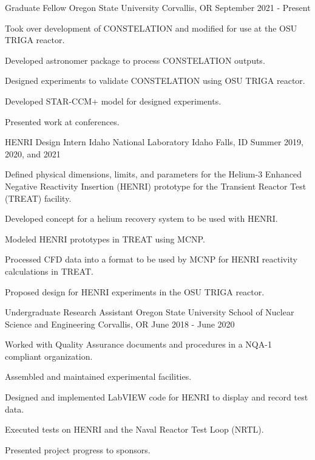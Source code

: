 
\begin{cventries}
  \cventry
    {Graduate Fellow} %
    {Oregon State University} %
    {Corvallis, OR} %
    {September 2021 - Present} %
    {
      \begin{cvitems} %
        \item {Took over development of CONSTELATION and modified for use at the OSU TRIGA reactor.}
        \item{Developed astronomer package to process CONSTELATION outputs.}
        \item{Designed experiments to validate CONSTELATION using OSU TRIGA reactor.}
        \item{Developed STAR-CCM+ model for designed experiments.}
        \item{Presented work at conferences.}
      \end{cvitems}
    }


  \cventry
    {HENRI Design Intern} %
    {Idaho National Laboratory} %
    {Idaho Falls, ID} %
    {Summer 2019, 2020, and 2021} %
    {
      \begin{cvitems} %
        \item {Defined physical dimensions, limits, and parameters for the Helium-3 Enhanced Negative Reactivity Insertion (HENRI) prototype for the Transient Reactor Test (TREAT) facility.}
        \item{Developed concept for a helium recovery system to be used with HENRI.}
        \item{Modeled HENRI prototypes in TREAT using MCNP.}
        \item{Processed CFD data into a format to be used by MCNP for HENRI reactivity calculations in TREAT.}
        \item{Proposed design for HENRI experiments in the OSU TRIGA reactor.}
      \end{cvitems}
    }

  \cventry
    {Undergraduate Research Assistant} %
    {Oregon State University School of Nuclear Science and Engineering} %
    {Corvallis, OR} %
    {June 2018 - June 2020} %
    {
      \begin{cvitems} %
        \item {Worked with Quality Assurance documents and procedures in a NQA-1 compliant organization.}
        \item{Assembled and maintained experimental facilities.}
        \item{Designed and implemented LabVIEW code for HENRI to display and record test data.}
        \item{Executed tests on HENRI and the Naval Reactor Test Loop (NRTL).}
        \item{Presented project progress to sponsors.}
      \end{cvitems}
    }


\end{cventries}
